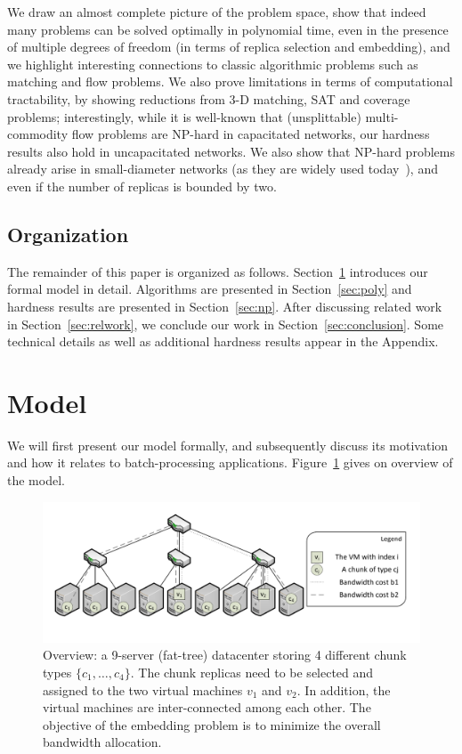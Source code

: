 \documentclass[9pt,twocolumn]{scrartcl}
\begin{document}
We draw an almost complete picture of the problem space, show that indeed many problems
can be solved optimally in polynomial time, even in the presence of multiple degrees of freedom (in terms of
replica selection and embedding), and
we highlight interesting connections to classic algorithmic
problems such as matching and flow problems.
We also prove limitations in terms of
computational tractability, by showing reductions from 3-D matching, SAT and coverage problems; interestingly,
while it is well-known that (unsplittable) multi-commodity flow
problems are NP-hard in capacitated networks, our hardness results also hold in uncapacitated
networks. We also show that NP-hard problems already arise in small-diameter networks (as they are
widely used today~\cite{fattree}),
and even if the number of replicas is bounded by two.


\subsection{Organization}

The remainder of this paper is organized as follows.
Section~\ref{sec:model} introduces our formal model in detail.
Algorithms are presented in Section~\ref{sec:poly} and
hardness results are presented in Section~\ref{sec:np}.
After discussing related work in Section~\ref{sec:relwork},
we conclude our work in Section~\ref{sec:conclusion}.
Some technical details as well as additional hardness results
appear in the Appendix.

\section{Model}\label{sec:model}

We will first present our model formally, and subsequently discuss its motivation and how it relates
to batch-processing applications. Figure~\ref{fig:overview} gives on overview of the model.

\begin{figure}[t]
\centering
\includegraphics[width=0.99\columnwidth]{figs/overview-fig.pdf}
\caption{Overview: a 9-server (fat-tree) datacenter storing 4 different chunk
types $\{c_1,\ldots,c_4\}$. The chunk replicas need to be selected and assigned to the two
 virtual machines $v_1$ and $v_2$. In addition, the virtual machines are inter-connected among
 each other. The objective of the embedding problem is to minimize the overall bandwidth allocation.}
\label{fig:overview}
\end{figure}
\end{document}
